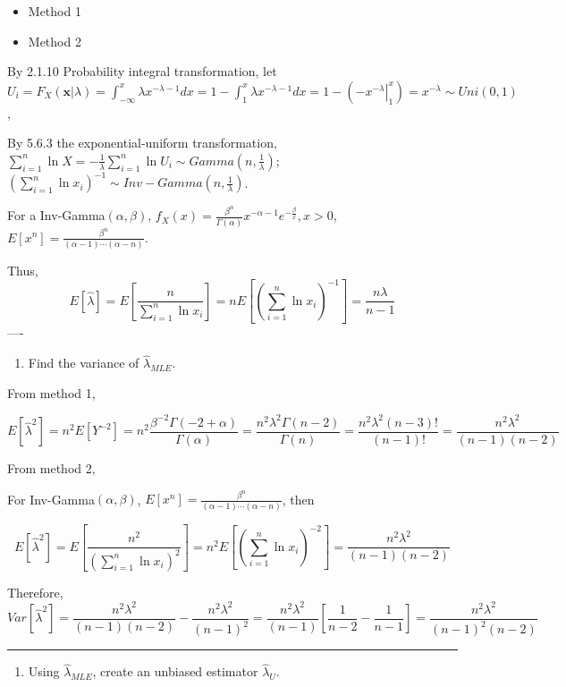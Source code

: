 \documentclass[12pt,]{article}
\providecommand{\tightlist}{%
  \setlength{\itemsep}{0pt}\setlength{\parskip}{0pt}}
\begin{document}
\begin{itemize}
\item
  Method 1
\item
  Method 2
\end{itemize}

By 2.1.10 Probability integral transformation, let
\(U_i=F_X(\mathbf{x}|\lambda)=\int_{-\infty}^x\lambda x^{-\lambda-1}dx=1-\int_1^{x}\lambda x^{-\lambda-1}dx=1-(\left.-x^{-\lambda}\right|_{1}^x)=x^{-\lambda} \sim Uni(0,1)\),

By 5.6.3 the exponential-uniform transformation,
\(\sum_{i=1}^n\ln X=-\frac1\lambda\sum_{i=1}^n\ln U_i\sim Gamma(n,\frac1\lambda)\);
\((\sum_{i=1}^n\ln x_i)^{-1}\sim Inv-Gamma(n,\frac1\lambda)\).

For a Inv-Gamma\((\alpha,\beta)\),
\(f_{X}(x)=\frac{\beta^{\alpha}}{\Gamma(\alpha)}x^{-\alpha-1}e^{-\frac\beta{x}},x>0\),
\(E[x^n]=\frac{\beta^n}{(\alpha-1)\cdots(\alpha-n)}\).

Thus,
\[E[\hat\lambda]=E\left[\frac{n}{\sum_{i=1}^n\ln x_i}\right]=nE\left[(\sum_{i=1}^n\ln x_i)^{-1}\right]=\frac{n\lambda}{n-1}\]
----

\begin{enumerate}
\def\labelenumi{\alph{enumi}.}
\setcounter{enumi}{2}
\tightlist
\item
  Find the variance of \(\hat\lambda_{MLE}\).
\end{enumerate}

From method 1,

\[E[\hat\lambda^2]=n^2E[Y^{-2}]=n^2\frac{\beta^{-2}\Gamma(-2+\alpha)}{\Gamma(\alpha)}=\frac{n^2\lambda^2\Gamma(n-2)}{\Gamma(n)}=\frac{n^2\lambda^2(n-3)!}{(n-1)!}=\frac{n^2\lambda^2}{(n-1)(n-2)}\]

From method 2,

For Inv-Gamma\((\alpha,\beta)\),
\(E[x^n]=\frac{\beta^n}{(\alpha-1)\cdots(\alpha-n)}\), then

\[E[\hat\lambda^2]=E\left[\frac{n^2}{(\sum_{i=1}^n\ln x_i)^2}\right]=n^2E\left[(\sum_{i=1}^n\ln x_i)^{-2}\right]=\frac{n^2\lambda^2}{(n-1)(n-2)}\]

Therefore,
\[Var[\hat\lambda^2]=\frac{n^2\lambda^2}{(n-1)(n-2)}-\frac{n^2\lambda^2}{(n-1)^2}=\frac{n^2\lambda^2}{(n-1)}[\frac1{n-2}-\frac1{n-1}]=\frac{n^2\lambda^2}{(n-1)^2(n-2)}\]

\begin{center}\rule{0.5\linewidth}{\linethickness}\end{center}

\begin{enumerate}
\def\labelenumi{\alph{enumi}.}
\setcounter{enumi}{3}
\tightlist
\item
  Using \(\hat\lambda_{MLE}\), create an unbiased estimator
  \(\hat\lambda_{U}\).
\end{enumerate}
\end{document}
